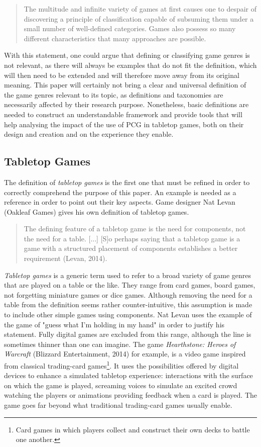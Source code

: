 \begin{quotation}
The multitude and infinite variety of games at first causes one to despair of discovering a principle of classification capable of subsuming them under a small number of well-defined categories. Games also possess so many different characteristics that many approaches are possible.
\end{quotation}

With this statement, one could argue that defining or classifying game genres is not relevant, as there will always be examples that do not fit the definition, which will then need to be extended and will therefore move away from its original meaning. This paper will certainly not bring a clear and universal definition of the game genres relevant to its topic, as definitions and taxonomies are necessarily affected by their research purpose. Nonetheless, basic definitions are needed to construct an understandable framework and provide tools that will help analysing the impact of the use of PCG in tabletop games, both on their design and creation and on the experience they enable.

\subsection{Tabletop Games}
The definition of \textit{tabletop games} is the first one that must be refined in order to correctly comprehend the purpose of this paper. An example is needed as a reference in order to point out their key aspects. Game designer Nat Levan (Oakleaf Games) gives his own definition of tabletop games. 

\begin{quotation}
The defining feature of a tabletop game is the need for components, not the need for a table. [...] [S]o perhaps saying that a tabletop game is a game with a structured placement of components establishes a better requirement (Levan, 2014)\cite{web:oak}.
\end{quotation}

\textit{Tabletop games} is a generic term used to refer to a broad variety of game genres that are played on a table or the like. They range from card games, board games, not forgetting miniature games or dice games. Although removing the need for a table from the definition seems rather counter-intuitive, this assumption is made to include other simple games using components. 
Nat Levan uses the example of the game of "guess what I'm holding in my hand"\cite{web:oak} in order to justify his statement. Fully digital games are excluded from this range, although the line is sometimes thinner than one can imagine. The game \textit{Hearthstone: Heroes of Warcraft} (Blizzard Entertainment, 2014)\cite{game:hs} for example, is a video game inspired from classical trading-card games\footnote{Card games in which players collect and construct their own decks to battle one another.}. It uses the possibilities offered by digital devices to enhance a simulated tabletop experience: interactions with the surface on which the game is played, screaming voices to simulate an excited crowd watching the players or animations providing feedback when a card is played. The game goes far beyond what traditional trading-card games usually enable.

